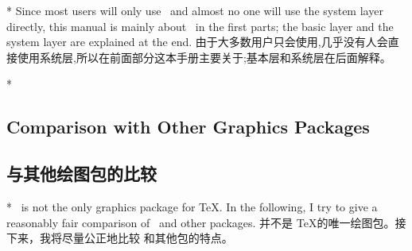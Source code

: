 \begin{paracol}{2}
\switchcolumn[0]*
Since most users will only use \tikzname\ and almost no one will use the system
layer directly, this manual is mainly about \tikzname\ in the first parts; the
basic layer and the system layer are explained at the end.
\switchcolumn
由于大多数用户只会使用\tikzname ,几乎没有人会直接使用系统层,所以在前面部分这本手册主要关于\tikzname ;基本层和系统层在后面解释。


\switchcolumn[0]*
\subsection{Comparison with Other Graphics Packages}
\switchcolumn
\subsection{与其他绘图包的比较}
\switchcolumn[0]*
\tikzname\ is not the only graphics package for \TeX. In the following, I try
to give a reasonably fair comparison of \tikzname\ and other packages.
%
\switchcolumn
\tikzname 并不是 \TeX 的唯一绘图包。接下来，我将尽量公正地比较 \tikzname 和其他包的特点。
\end{paracol}

